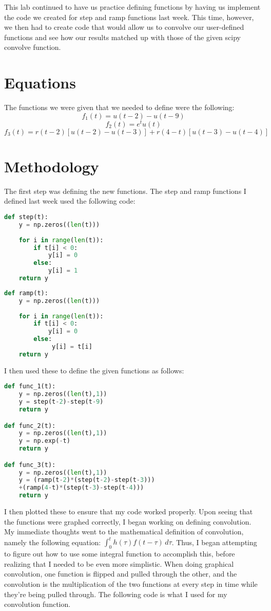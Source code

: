 \documentclass[12pt]{report}
\begin{document}
This lab continued to have us practice defining functions by having us implement the code we created for step and ramp functions last week. This time, however, we then had to create code that would allow us to convolve our user-defined functions and see how our results matched up with those of the given scipy convolve function.

\section{Equations}

The functions we were given that we needed to define were the following:
$$f_1(t)= u(t-2) - u(t-9)$$
$$f_2(t)= e^tu(t)$$
$$f_3(t)= r(t-2)[u(t-2) - u(t-3)] + r(4-t)[u(t-3) - u(t-4)]$$

 \section{Methodology}
 
 The first step was defining the new functions. The step and ramp functions I defined last week used the following code: 
 \begin{multicols}{2}
 \begin{lstlisting}[language=Python]
 def step(t):
    y = np.zeros((len(t)))
    
    for i in range(len(t)):
        if t[i] < 0:
            y[i] = 0
        else:
            y[i] = 1
    return y
\end{lstlisting}
\begin{lstlisting}[language=Python]
def ramp(t):
    y = np.zeros((len(t)))
    
    for i in range(len(t)):
        if t[i] < 0:
            y[i] = 0
        else:
             y[i] = t[i]
    return y
\end{lstlisting}
\end{multicols}

I then used these to define the given functions as follows:
\begin{lstlisting}[language=Python]
def func_1(t):
    y = np.zeros((len(t),1))
    y = step(t-2)-step(t-9)
    return y

def func_2(t):
    y = np.zeros((len(t),1))
    y = np.exp(-t)
    return y

def func_3(t):
    y = np.zeros((len(t),1))
    y = (ramp(t-2)*(step(t-2)-step(t-3)))
    +(ramp(4-t)*(step(t-3)-step(t-4)))
    return y
\end{lstlisting}
I then plotted these to ensure that my code worked properly. Upon seeing that the functions were graphed correctly, I began working on defining convolution. My immediate thoughts went to the mathematical definition of convolution, namely the following equation: $\int_{0}^{t} h(\tau)f(t-\tau)\,d\tau$. Thus, I began attempting to figure out how to use some integral function to accomplish this, before realizing that I needed to be even more simplistic. When doing graphical convolution, one function is flipped and pulled through the other, and the convolution is the multiplication of the two functions at every step in time while they're being pulled through. The following code is what I used for my convolution function.
\end{document}
